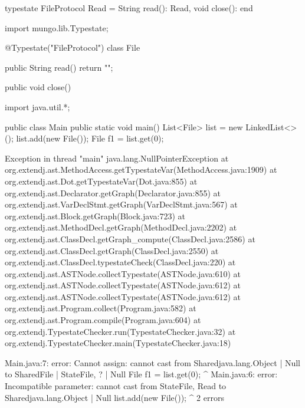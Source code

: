 \begin{code}
typestate FileProtocol {
  Read = {
    String read(): Read,
    void close(): end
  }
}\end{code}

\begin{code}
import mungo.lib.Typestate;

@Typestate("FileProtocol")
class File {

  public String read() {
    return "";
  }

  public void close() {
  }

}\end{code}

\begin{code}
import java.util.*;

public class Main {
  public static void main() {
    List<File> list = new LinkedList<>();
    list.add(new File());
    File f1 = list.get(0);
  }
}\end{code}

\lstset{language=,caption=Mungo's output}
\begin{code}
Exception in thread "main" java.lang.NullPointerException
	at org.extendj.ast.MethodAccess.getTypestateVar(MethodAccess.java:1909)
	at org.extendj.ast.Dot.getTypestateVar(Dot.java:855)
	at org.extendj.ast.Declarator.getGraph(Declarator.java:855)
	at org.extendj.ast.VarDeclStmt.getGraph(VarDeclStmt.java:567)
	at org.extendj.ast.Block.getGraph(Block.java:723)
	at org.extendj.ast.MethodDecl.getGraph(MethodDecl.java:2202)
	at org.extendj.ast.ClassDecl.getGraph_compute(ClassDecl.java:2586)
	at org.extendj.ast.ClassDecl.getGraph(ClassDecl.java:2550)
	at org.extendj.ast.ClassDecl.typestateCheck(ClassDecl.java:220)
	at org.extendj.ast.ASTNode.collectTypestate(ASTNode.java:610)
	at org.extendj.ast.ASTNode.collectTypestate(ASTNode.java:612)
	at org.extendj.ast.ASTNode.collectTypestate(ASTNode.java:612)
	at org.extendj.ast.Program.collect(Program.java:582)
	at org.extendj.ast.Program.compile(Program.java:604)
	at org.extendj.TypestateChecker.run(TypestateChecker.java:32)
	at org.extendj.TypestateChecker.main(TypestateChecker.java:18)
\end{code}

\lstset{language=,caption=Our tool's output}
\begin{code}
Main.java:7: error: Cannot assign: cannot cast from Shared{java.lang.Object} | Null to Shared{File} | State{File, ?} | Null
    File f1 = list.get(0);
         ^
Main.java:6: error: Incompatible parameter: cannot cast from State{File, Read} to Shared{java.lang.Object} | Null
    list.add(new File());
             ^
2 errors
\end{code}

